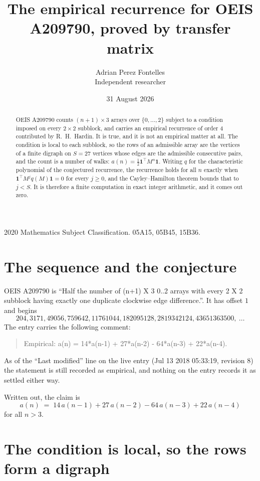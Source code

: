 \documentclass[11pt,a4paper]{article}
\title{The empirical recurrence for OEIS A209790, proved by transfer matrix}
\author{Adrian Perez Fontelles\\ \small Independent researcher}
\date{31 August 2026}
\theoremstyle{plain}
\theoremstyle{definition}
\begin{document}
\maketitle

\begin{abstract}
OEIS A209790 counts $(n+1)\times3$ arrays over $\{0,\dots,2\}$ subject to a condition imposed on
every $2\times2$ subblock, and carries an empirical recurrence of order $4$ contributed
by R.~H.~Hardin. It is true, and it is not an empirical matter at all. The condition is local
to each subblock, so the rows of an admissible array are the vertices of a finite digraph
on $S=27$ vertices whose edges are the admissible consecutive pairs, and the count is a
number of walks: $a(n)=\tfrac1{2}\mathbf{1}^{\!\top}M^{n}\mathbf{1}$. Writing $q$
for the characteristic polynomial of the conjectured recurrence, the recurrence holds for all
$n$ exactly when $\mathbf{1}^{\!\top}M^{j}q(M)\mathbf{1}=0$ for every $j\ge0$, and the
Cayley--Hamilton theorem bounds that to $j<S$. It is therefore a finite computation in exact
integer arithmetic, and it comes out zero.
\end{abstract}

\noindent\small 2020 Mathematics Subject Classification. 05A15, 05B45, 15B36.\normalsize

\section{The sequence and the conjecture}

OEIS A209790 is ``Half the number of (n+1) X 3 0..2 arrays with every 2 X 2 subblock having exactly one duplicate clockwise edge difference.''. It has offset $1$ and begins
\[
204, 3171, 49056, 759642, 11761044, 182095128, 2819342124, 43651363500,\ \dots
\]
The entry carries the following comment:
\begin{quote}\small
Empirical: a(n) = 14*a(n-1) + 27*a(n-2) - 64*a(n-3) + 22*a(n-4).
\end{quote}
As of the ``Last modified'' line on the live entry (Jul 13 2018 05:33:19, revision 8) the statement is
still recorded as empirical, and nothing on the entry records it as settled either way.

Written out, the claim is
\begin{equation}\label{eq:conj}
a(n)\;=\;14\,a(n-1) + 27\,a(n-2) - 64\,a(n-3) + 22\,a(n-4)
\end{equation}
for all $n>3$.

\section{The condition is local, so the rows form a digraph}
\end{document}
